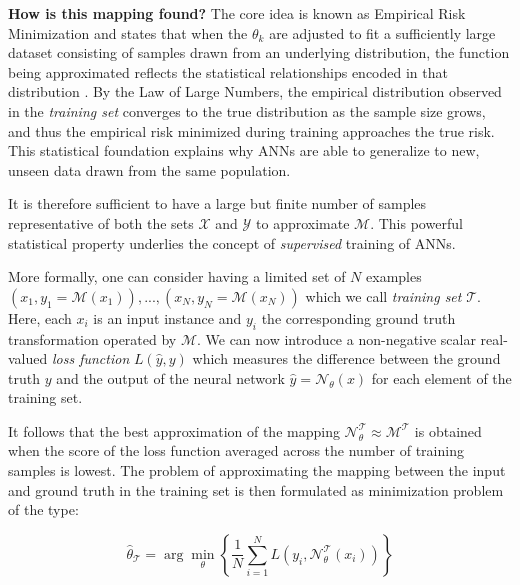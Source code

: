 \textbf{How is this mapping found?} The core idea is known as Empirical Risk Minimization and states that 
when the $\theta_k$ are adjusted to fit a sufficiently large dataset consisting of samples drawn from an underlying distribution, 
the function being approximated reflects the statistical relationships encoded in that distribution \cite{Hornik_1990}.
By the Law of Large Numbers, the empirical distribution observed in the \textit{training set} converges to the true 
distribution as the sample size grows, and thus the empirical risk minimized during training approaches the true 
risk. This statistical foundation explains why ANNs are able to generalize to new, unseen data drawn from the 
same population. 

It is therefore sufficient to have a large but finite number of samples representative of both the sets $\mathcal{X}$ 
and $\mathcal{Y}$ to approximate $\mathcal{M}$. This powerful statistical property underlies the concept of \textit{supervised} 
training of ANNs. 

More formally, one can consider having a limited set of $N$ examples $(x_1,y_1 = \mathcal{M}(x_1)), ..., (x_N, y_N = \mathcal{M}(x_N))$ 
which we call \textit{training set} $\mathcal{T}$. Here, each $x_i$ is an input instance and $y_i$ the 
corresponding ground truth transformation operated by $\mathcal{M}$. We can now introduce a non-negative scalar 
real-valued \textit{loss function} $L(\hat{y},y )$ which measures the difference between the ground truth $y$ and the 
output of the neural network $\hat{y} = \mathcal{N}_\theta (x)$ for each element of the training set.

It follows that the best approximation of the mapping $ \mathcal{N}_\theta^{\mathcal{T}} \approx \mathcal{M}^{\mathcal{T}}$ is 
obtained when the score of the loss function averaged across the number of training samples is lowest.
The problem of approximating the mapping between the input and ground truth in the training set is then formulated as 
minimization problem of the type: 

\begin{equation}
    \hat{\theta}_{\mathcal T}
    = \arg\min_{\theta} 
    \left\{ \frac{1}{N} \sum_{i=1}^N 
    L\!\left(y_i, \mathcal{N}_{\theta}^{\mathcal{T}}(x_i)\right) 
    \right\}
\end{equation}

